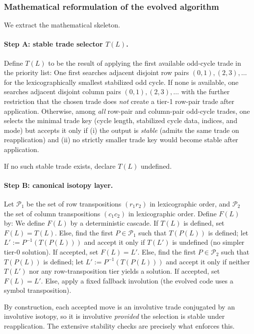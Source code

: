\documentclass[11pt]{amsart}
\begin{document}
\subsubsection{Mathematical reformulation of the evolved algorithm}
We extract the mathematical skeleton.

\paragraph{Step A: stable trade selector $T(L)$.}
Define $T(L)$ to be the result of applying the first available odd-cycle trade in the priority list:
One first searches adjacent disjoint row pairs $(0,1),(2,3),\dots$ for the lexicographically smallest stabilized odd cycle. If none is available, one searches adjacent disjoint column pairs $(0,1),(2,3),\dots$ with the further restriction that the chosen trade does \emph{not} create a tier-1 row-pair trade after application. Otherwise, among \emph{all} row-pair and column-pair odd-cycle trades, one selects the minimal trade key (cycle length, stabilized cycle data, indices, and mode) but accepts it only if (i) the output is \emph{stable} (admits the same trade on reapplication) and (ii) no strictly smaller trade key would become stable after application.

If no such stable trade exists, declare $T(L)$ undefined.

\paragraph{Step B: canonical isotopy layer.}
Let $\mathcal{P}_1$ be the set of row transpositions $(r_1r_2)$ in lexicographic order,
and $\mathcal{P}_2$ the set of column transpositions $(c_1c_2)$ in lexicographic order.
Define $F(L)$ by:
We define $F(L)$ by a deterministic cascade. If $T(L)$ is defined, set $F(L)=T(L)$. Else, find the first $P\in\mathcal{P}_1$ such that $T(P(L))$ is defined; let $L':=P^{-1}(T(P(L)))$ and accept it only if $T(L')$ is undefined (no simpler tier-0 solution). If accepted, set $F(L)=L'$. Else, find the first $P\in\mathcal{P}_2$ such that $T(P(L))$ is defined; let $L':=P^{-1}(T(P(L)))$ and accept it only if neither $T(L')$ nor any row-transposition tier yields a solution.
If accepted, set $F(L)=L'$. Else, apply a fixed fallback involution (the evolved code uses a symbol transposition).


By construction, each accepted move is an involutive trade conjugated by an involutive isotopy, so it is involutive \emph{provided} the selection is stable under reapplication. The extensive stability checks are precisely what enforces this.
\end{document}
